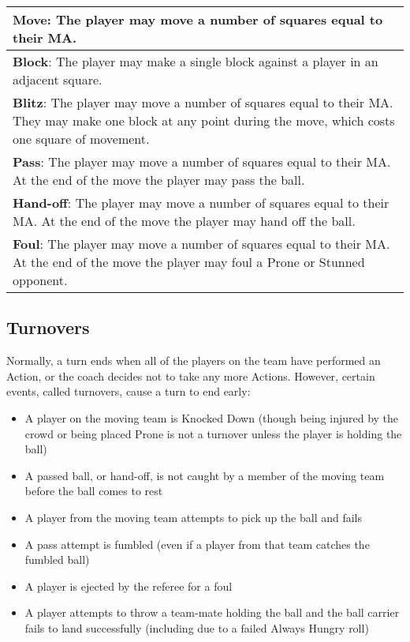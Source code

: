 \begin{multicols}{2}
\medskip
\begin{tabularx}{\linewidth}{ | X | }
\hline
\textbf{Move}: The player may move a number of squares equal to their MA. \\
\hline
\textbf{Block}: The player may make a single block against a player in an adjacent square. \\
\hline
\textbf{Blitz}: The player may move a number of squares equal to their MA. They may make one block at any point during the move, which costs one square of movement. \\
\hline
\textbf{Pass}: The player may move a number of squares equal to their MA. At the end of the move the player may pass the ball. \\
\hline
\textbf{Hand-off}: The player may move a number of squares equal to their MA. At the end of the move the player may hand off the ball. \\
\hline
\textbf{Foul}: The player may move a number of squares equal to their MA. At the end of the move the player may foul a Prone or Stunned opponent. \\
\hline
\end{tabularx}
\medskip

\subsection{Turnovers}
\par Normally, a turn ends when all of the players on the team have performed an Action, or the coach decides not to take any more Actions. However, certain events, called turnovers, cause a turn to end early:

\begin{itemize}
\item A player on the moving team is Knocked Down (though being injured by the crowd or being placed Prone is not a turnover unless the player is holding the ball)
\item A passed ball, or hand-off, is not caught by a member of the moving team before the ball comes to rest
\item A player from the moving team attempts to pick up the ball and fails
\item A pass attempt is fumbled (even if a player from that team catches the fumbled ball)
\item A player is ejected by the referee for a foul
\item A player attempts to throw a team-mate holding the ball and the ball carrier fails to land successfully (including due to a failed Always Hungry roll)
\end{itemize}


\end{multicols}
